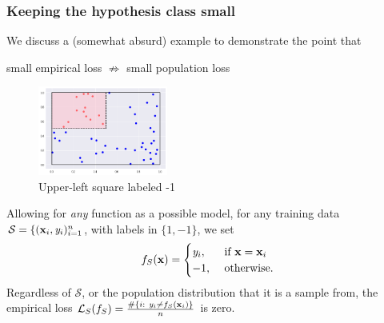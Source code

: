\documentclass[smaller]{beamer}
\theoremstyle{example}
\newcommand{\x}{\textbf{x}}
\newcommand{\ix}[1]{{\it #1}}
\begin{document}
\begin{frame}
    \frametitle{Keeping the hypothesis class small}
We discuss a (somewhat absurd) example to demonstrate the point that 
\begin{center} small empirical loss $\not\Rightarrow$ small population loss\end{center}

\begin{figure}
    \begin{center}
        \includegraphics[width=0.38\textwidth]{../../Images/fourth_square-13v37.png}
    \end{center}
    \caption{Upper-left square labeled -1}
\end{figure}

Allowing for \textit{any} function as a possible model, for any training data $\mathcal S = \{(\x_i, \ix y_i)_{i=1}^n$, with labels in $\{1,-1\}$, we set 
        \[f_S(\x) = \begin{cases}\ix y_i,& \textrm{ if }\x = \x_i \\ 
                                    -1,& \textrm{ otherwise.}
        \end{cases}\]
Regardless of $\mathcal S$, or the population distribution that it is a sample from, the empirical loss $\mathcal L_{S}(f_S) = \frac{\#\{i:\ \ix y_i \ne f_S(\x_i)\}}{n}$ is zero.
\end{frame}
\end{document}
